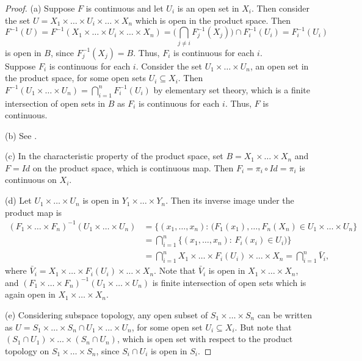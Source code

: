 \documentclass[11pt,a4paper]{article}
\begin{document}
\begin{proof}
(a) \forward Suppose $F$ is continuous and let $U_i$ is an open set in $X_i$. Then consider the set $U = X_1\times\ldots\times U_i\times\ldots\times X_n$ which is open in the product space. Then $$F^{-1}(U) = F^{-1}(X_1\times\ldots\times U_i\times\ldots\times X_n) = \Big(\bigcap_{j\neq i} F_j^{-1}(X_j)\Big)\cap F_i^{-1}(U_i) = F_i^{-1}(U_i) $$ is open in $B$, since $F_j^{-1}(X_j) = B$. Thus, $F_i$ is continuous for each $i$. \\
\converse Suppose $F_i$ is continuous for each $i$. Consider the set $U_1\times\ldots\times U_n$, an open set in the product space, for some open sets $U_i\subseteq X_i$. Then $F^{-1}(U_1\times\ldots\times U_n) = \bigcap_{i = 1}^n F^{-1}_i(U_i)$ by elementary set theory, which is a finite intersection of open sets in $B$ as $F_i$ is continuous for each $i$. Thus, $F$ is continuous.

(b) See \cite[Thm. 3.30]{JohnLee}.

(c) In the characteristic property of the product space, set $B = X_1\times\ldots\times X_n$ and $F = Id$ on the product space, which is continuous map. Then $F_i = \pi_i\circ Id = \pi_i$ is continuous on $X_i$.

(d) Let $U_1\times\ldots\times U_n$ is open in $Y_1\times\ldots\times Y_n$. Then its inverse image under the product map is 
\begin{align*}
(F_1\times \ldots\times F_n)^{-1}(U_1\times \ldots\times U_n) 
&= \{(x_1,\ldots,x_n):\,(F_1(x_1),\ldots,F_n(X_n)\in U_1\times \ldots\times U_n\} \\
&= \bigcap_{i=1}^n\{(x_1,\ldots,x_n):\,F_i(x_i)\in U_i)\} \\
&= \bigcap_{i=1}^n X_1\times\ldots\times F_i(U_i)\times\ldots\times X_n = \bigcap_{i=1}^n \bar{V}_i, 
\end{align*}
where $\bar{V}_i = X_1\times\ldots\times F_i(U_i)\times\ldots\times X_n$. Note that $\bar{V}_i$ is open in $X_1\times \ldots\times X_n$, and $(F_1\times \ldots\times F_n)^{-1}(U_1\times \ldots\times U_n)$ is finite intersection of open sets which is again open in $X_1\times \ldots\times X_n$.

(e) Considering subspace topology, any open subset of $S_1\times\ldots\times S_n$ can be written as $U = S_1\times\ldots\times S_n\cap U_1\times\ldots\times U_n$, for some open set $U_i\subseteq X_i$. But note that $(S_1\cap U_1)\times\ldots\times (S_n\cap U_n)$, which is open set with respect to the product topology on $S_1\times\ldots\times S_n$, since $S_i\cap U_i$ is open in $S_i$.


\end{proof}
\end{document}
